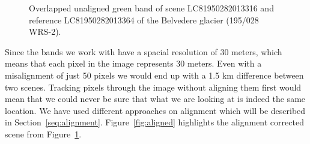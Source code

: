 \documentclass[11pt, a4paper]{report}
\begin{document}
\begin{figure}[h]
\begin{minipage}{0.45\textwidth}
	\end{minipage}
	\caption{Overlapped unaligned green band of scene LC81950282013316 and reference LC81950282013364 of the Belvedere glacier (195/028 WRS-2).}
	\label{fig:unaligned}	
	\end{figure}
	Since the bands we work with have a spacial resolution of 30 meters, which means that each pixel in the image represents 30 meters. Even with a misalignment of just 50 pixels we would end up with a 1.5 km difference between two scenes. Tracking pixels through the image without aligning them first would mean that we could never be sure that what we are looking at is indeed the same location. We have used different approaches on alignment which will be described in Section~\ref{seq:alignment}. Figure~\ref{fig:aligned} highlights the alignment corrected scene from Figure~\ref{fig:unaligned}. 
\end{document}
